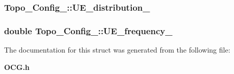 \subsubsection[{UE\_\-distribution\_\-}]{ {\bf Topo\_\-Config\_\-::UE\_\-distribution\_\-}}\label{structTopo__Config___ac45140d1d9faf441490036c6e0ba33b}


\subsubsection[{UE\_\-frequency\_\-}]{\setlength{\rightskip}{0pt plus 5cm}double {\bf Topo\_\-Config\_\-::UE\_\-frequency\_\-}}\label{structTopo__Config___2c7bd9af90ac769d8654ab3c660754f0}




The documentation for this struct was generated from the following file:\begin{CompactItemize}
\item 
{\bf OCG.h}\end{CompactItemize}
